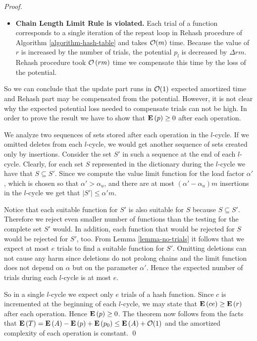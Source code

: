 \begin{proof}
\begin{itemize}
	\item \textbf{Chain Length Limit Rule is violated.} Each trial of a function corresponds to a single iteration of the repeat loop in Rehash procedure of Algorithm \ref{algorithm-hash-table} and takes $\mathcal{O}(m)$ time. Because the value of $r$ is increased by the number of trials, the potential $p_l$ is decreased by $\Delta rm$.  Rehash procedure took $\mathcal{O}\left(rm\right)$ time we compensate this time by the loss of the potential.
\end{itemize}

So we can conclude that the update part runs in $\mathcal{O}(1)$ expected amortized time and Rehash part may be compensated from the potential. However, it is not clear why  the expected potential loss needed to compensate trials can not be high. In order to prove the result we have to show that $\mathbf{E}\left(p\right) \geq 0$ after each operation.

We analyze two sequences of sets stored after each operation in the $l$-cycle. 
If we omitted deletes from each $l$-cycle, we would get another sequence of sets created only by insertions.
Consider the set $S'$ in such a sequence at the end of each $l$-cycle. 
Clearly, for each set $S$ represented in the dictionary during the $l$-cycle we have that $S \subseteq S'$. 
Since we compute the value limit function for the load factor $\alpha'$, which is chosen so that $\alpha' > \alpha_u$, and there are at most $(\alpha' - \alpha_u)m$ insertions in the $l$-cycle we get that $|S'| \leq \alpha' m$.

Notice that each suitable function for $S'$ is also suitable for $S$ because $S \subseteq S'$. 
Therefore we reject even smaller number of functions than the testing for the complete set $S'$ would. 
In addition, each function that would be rejected for $S$ would be rejected for $S'$, too.
From Lemma \ref{lemma-no-trials} it follows that we expect at most $e$ trials to find a suitable function for $S'$. 
Omitting deletions can not cause any harm since deletions do not prolong chains and the limit function does not depend on $\alpha$ but on the parameter $\alpha'$.
Hence the expected number of trials during each $l$-cycle is at most $e$. 

So in a single $l$-cycle we expect only $e$ trials of a hash function.
Since $c$ is incremented at the beginning of each $l$-cycle, we may state that $\mathbf{E}\left(ce\right) \geq \mathbf{E}\left(r\right)$ after each operation.
Hence $\mathbf{E}\left(p\right) \geq 0$. 
The theorem now follows from the facts that $\mathbf{E}\left(T\right) = \mathbf{E}\left(A\right) - \mathbf{E}\left(p\right) + \mathbf{E}\left(p_0\right) \leq \mathbf{E}\left(A\right) + \mathcal{O}(1)$ and the amortized complexity of each operation is constant.
\qed
\end{proof}
